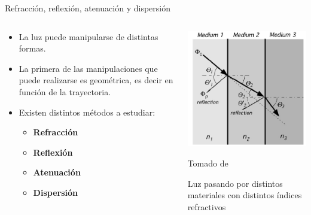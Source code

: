 \documentclass[aspectratio=169]{beamer}
\begin{document}
\begin{frame}{Refracción, reflexión, atenuación y dispersión}
    \begin{columns}[c, onlytextwidth]
        \begin{column}{0.55\textwidth}
            \begin{itemize}
                \item La luz puede manipularse de distintas formas.
                \item La primera de las manipulaciones que puede realizarse es geométrica, es decir en función de la trayectoria. 
                \item Existen distintos métodos a estudiar: 
                \begin{itemize}
                    \item \textbf{Refracción}
                    \item \textbf{Reflexión}
                    \item \textbf{Atenuación}
                    \item \textbf{Dispersión}
                \end{itemize}
            \end{itemize}
        \end{column}
        \begin{column}{0.45\textwidth}
            \centering
            \includegraphics[width = 0.9\linewidth]{fig/Optica/Radiometry.PNG}
            
            \tiny{Tomado de \cite{Fraden_2016}}
            
            \tiny{Luz pasando por distintos materiales con distintos índices refractivos}
        \end{column}
    \end{columns}
\end{frame}
\end{document}
